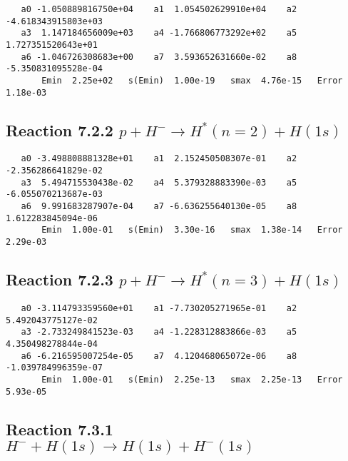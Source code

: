 \documentclass[12pt]{article}
\begin{document}
\begin{small}\begin{verbatim}
   a0 -1.050889816750e+04    a1  1.054502629910e+04    a2 -4.618343915803e+03
   a3  1.147184656009e+03    a4 -1.766806773292e+02    a5  1.727351520643e+01
   a6 -1.046726308683e+00    a7  3.593652631660e-02    a8 -5.350831095528e-04
       Emin  2.25e+02   s(Emin)  1.00e-19   smax  4.76e-15   Error  1.18e-03
\end{verbatim}\end{small}

\newpage
\subsection{
Reaction 7.2.2 $   p + H^- \rightarrow H^*(n=2) + H(1s)$}


\begin{small}\begin{verbatim}
   a0 -3.498808881328e+01    a1  2.152450508307e-01    a2 -2.356286641829e-02
   a3  5.494715530438e-02    a4  5.379328883390e-03    a5 -6.055070213687e-03
   a6  9.991683287907e-04    a7 -6.636255640130e-05    a8  1.612283845094e-06
       Emin  1.00e-01   s(Emin)  3.30e-16   smax  1.38e-14   Error  2.29e-03
\end{verbatim}\end{small}





                              


\newpage
\subsection{
Reaction 7.2.3 $   p + H^- \rightarrow H^*(n=3) + H(1s)$}


\begin{small}\begin{verbatim}
   a0 -3.114793359560e+01    a1 -7.730205271965e-01    a2  5.492043775127e-02
   a3 -2.733249841523e-03    a4 -1.228312883866e-03    a5  4.350498278844e-04
   a6 -6.216595007254e-05    a7  4.120468065072e-06    a8 -1.039784996359e-07
       Emin  1.00e-01   s(Emin)  2.25e-13   smax  2.25e-13   Error  5.93e-05
\end{verbatim}\end{small}

\newpage
\subsection{
Reaction 7.3.1 $   H^- + H(1s) \rightarrow H(1s) + H^-(1s)$}
\end{document}
